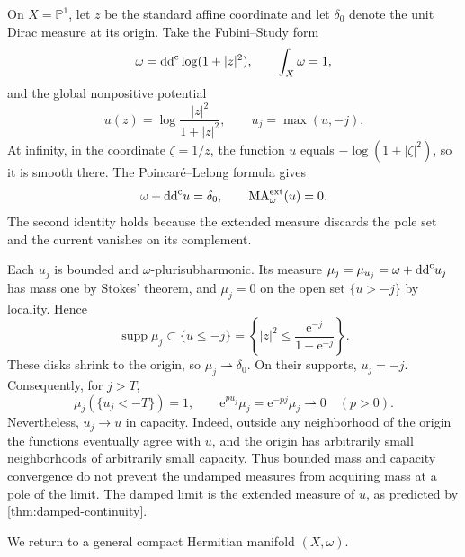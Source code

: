 \begin{example}\label{ex:p1-raw-tail}
On $X=\mathbb P^1$, let $z$ be the standard affine coordinate and let $\delta_0$ denote the unit Dirac measure at its origin. Take the Fubini--Study form
\[
 \omega=\mathrm{dd}^{\mathrm{c}}\log(1+|z|^2),\qquad \int_X\omega=1,
\]
and the global nonpositive potential
\[
 u(z)=\log\frac{|z|^2}{1+|z|^2},\qquad
 u_j=\max(u,-j).
\]
At infinity, in the coordinate $\zeta=1/z$, the function $u$ equals $-\log(1+|\zeta|^2)$, so it is smooth there. The Poincar\'e--Lelong formula gives
\[
 \omega+\mathrm{dd}^{\mathrm{c}} u=\delta_0,
 \qquad \mathrm{MA}^{\mathrm{ext}}_\omega(u)=0.
\]
The second identity holds because the extended measure discards the pole set and the current vanishes on its complement.

Each $u_j$ is bounded and $\omega$-plurisubharmonic. Its measure
$\mu_j=\mu_{u_j}=\omega+\mathrm{dd}^{\mathrm{c}} u_j$ has mass one by Stokes' theorem, and $\mu_j=0$ on the open set $\{u>-j\}$ by locality. Hence
\[
 \operatorname{supp}\mu_j\subset\{u\leq-j\}
 =\left\{|z|^2\leq\frac{\mathrm{e}^{-j}}{1-\mathrm{e}^{-j}}\right\}.
\]
These disks shrink to the origin, so $\mu_j\rightharpoonup\delta_0$.
On their supports, $u_j=-j$. Consequently, for $j>T$,
\[
 \mu_j(\{u_j<-T\})=1,
 \qquad \mathrm{e}^{pu_j}\mu_j=\mathrm{e}^{-pj}\mu_j\rightharpoonup0
 \quad(p>0).
\]
Nevertheless, $u_j\to u$ in capacity. Indeed, outside any neighborhood of the origin the functions eventually agree with $u$, and the origin has arbitrarily small neighborhoods of arbitrarily small capacity. Thus bounded mass and capacity convergence do not prevent the undamped measures from acquiring mass at a pole of the limit. The damped limit is the extended measure of $u$, as predicted by \cref{thm:damped-continuity}.
\end{example}

We return to a general compact Hermitian manifold $(X,\omega)$.

